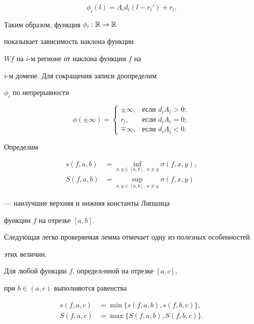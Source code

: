 $$


\phi_i (l) = A_i d_i (l - r_i') + r_i .


$$


Таким образом, функция $ \phi_i : {\Bbb R} \to {\Bbb R} $


показывает зависимость наклона функции


$Wf$ на $i$-м регионе от наклона функции $f$ на


$i$-м домене. Для сокращения записи доопределим


$ \phi_i $ по непрерывности


$$




\phi(\pm \infty )=


\begin{cases}


\pm \infty, & \text{если } d_i A_i > 0; \\


r_i,  & \text{если } d_i A_i = 0; \\


\mp \infty, & \text{если } d_i A_i < 0.


\end{cases}




$$





Определим


\begin{align*}


s(f,a,b) &= \inf_{x,y\in [a,b],\ x \ne y } \sigma(f,x,y), \\


S(f,a,b) &= \sup_{x,y\in [a,b],\ x \ne y } \sigma(f,x,y)


\end{align*} 


--- наилучшие верхняя и нижняя константы Липшица


функции $f$ на отрезке $[a,b]$.


Следующая легко проверяемая лемма отмечает одну из полезных особенностей


этих величин.





\begin{lem} \label{lem_slope}


Для любой функции $ f$, определeнной на отрезке $[a,c]$,


при $ b \in (a,c)$ выполняются равенства


\begin{align*}


s(f,a,c) &= \min \{ s(f,a,b), s(f,b,c) \}, \\


S(f,a,c) &= \max \{ S(f,a,b), S(f,b,c) \}. 


\end{align*}


\end{lem}





